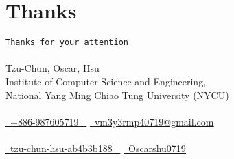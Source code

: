 \documentclass{beamer}
\begin{document}
\section{Thanks}
\begin{frame}
    \begin{center}
        \huge{\texttt{Thanks for your attention}} \\~\\
        \LARGE{Tzu-Chun, Oscar, Hsu} \\
        \vspace{8pt}
        \normalsize{
            Institute of Computer Science and Engineering, \\
            National Yang Ming Chiao Tung University (NYCU)} \\~\\
        \scriptsize{
            \href{tel:+886-987605719}{ \raisebox{-0.1\height}\faPhone\ \underline{+886-987605719} ~} 
            \href{mailto:vm3y3rmp40719@gmail.com}{\raisebox{-0.2\height}\faEnvelope\  \underline{vm3y3rmp40719@gmail.com}} \\~\\
            \href{https://www.linkedin.com/in/tzu-chun-hsu-ab4b3b188/}{\raisebox{-0.2\height}\faLinkedinSquare\ \underline{tzu-chun-hsu-ab4b3b188} ~}
            \href{https://github.com/Oscarshu0719}{\raisebox{-0.2\height}\faGithub\ \underline{Oscarshu0719}}
        }
    \end{center}
\end{frame}
\end{document}
